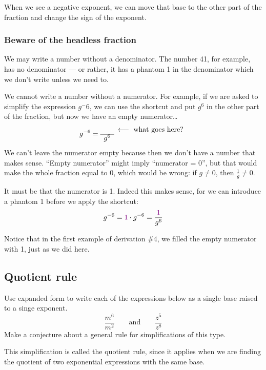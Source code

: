 When we see a negative exponent, we can move that base to the other part of the fraction and change the sign of the exponent.

\subsubsection{Beware of the headless fraction}

We may write a number without a denominator. The number 41, for example, has no denominator --- or rather, it has a phantom 1 in the denominator which we don't write unless we need to.

We cannot write a number without a numerator. For example, if we are asked to simplify the expression $g^-6$, we can use the shortcut and put $g^6$ in the other part of the fraction, but now we have an empty numerator\ldots \[g^{-6} = 
\begin{array}{cc}~~&\longleftarrow\text{ what goes here?}
\\\cline{1-1}
g^6 & ~~\end{array}\]
We can't leave the numerator empty because then we don't have a number that makes sense. ``Empty numerator'' might imply ``numerator = 0'', but that would make the whole fraction equal to 0, which would be wrong: if $g\neq0$, then $\frac{1}{g} \neq 0$.

It must be that the numerator is 1. Indeed this makes sense, for we can introduce a phantom 1 before we apply the shortcut:
\[g^{-6} = {\color{violet}1} \cdot g^{-6} = \frac{{\color{violet}1}}{g^6}\]

Notice that in the first example of derivation \#4, we filled the empty numerator with 1, just as we did here.


\subsection{Quotient rule}

\begin{boxexplore}[Derivation \#5]
Use expanded form to write each of the expressions below as a single base raised to a singe exponent.
\[\frac{m^6}{m^2} \qquad\text{and}\qquad \frac{z^5}{z^8}\]
Make a conjecture about a general rule for simplifications of this type.
\end{boxexplore}

This simplification is called the quotient rule, since it applies when we are finding the quotient of two exponential expressions with the same base.

